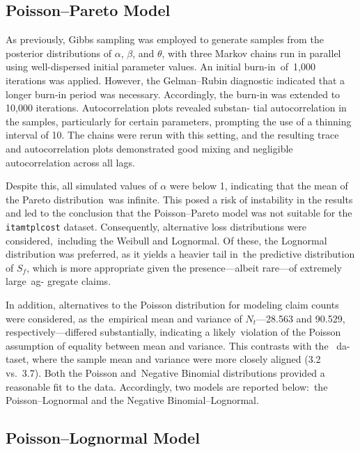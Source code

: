 \documentclass{Class/julia}
\begin{document}
\subsection{Poisson--Pareto Model}

As previously, Gibbs sampling was employed to generate samples from the posterior distributions of \(\alpha\), \(\beta\), and \(\theta\), with three Markov chains run in parallel using well-dispersed initial parameter values. An initial burn-in~of~1{,}000 iterations was applied. However, the Gelman--Rubin diagnostic \citeyearpar{Gelman1992} indicated that a longer burn-in period was necessary. Accordingly, the burn-in was extended to 10{,}000 iterations. Autocorrelation plots revealed substan- tial autocorrelation in the samples, particularly for certain parameters, prompting the use of a thinning interval of 10. The chains were rerun with this setting, and the resulting trace and autocorrelation plots demonstrated good mixing and negligible autocorrelation across all lags.

Despite this, all simulated values of \(\alpha\) were below 1, indicating that the mean of the Pareto distribution~was infinite. This posed a risk of instability in the results and led to the conclusion that the Poisson--Pareto model was not suitable for the \texttt{itamtplcost} dataset. Consequently, alternative loss distributions were considered,~including the Weibull and Lognormal. Of these, the Lognormal distribution was preferred, as it yields a heavier tail in~the predictive distribution of \( S_f \), which is more appropriate given the presence---albeit rare---of extremely large~ag- gregate claims.

In addition, alternatives to the Poisson distribution for modeling claim counts were considered, as the~empirical mean and variance of \( N_t \)—28.563 and 90.529, respectively—differed substantially, indicating a likely~violation of the Poisson assumption of equality between mean and variance. This contrasts with the \citet{rytgaard1990pareto}~da- taset, where the sample mean and variance were more closely aligned (3.2 vs.\ 3.7). Both the Poisson and~Negative Binomial distributions provided a reasonable fit to the data. Accordingly, two models are reported below:\ the Poisson--Lognormal and the Negative Binomial--Lognormal.

\subsection{Poisson--Lognormal Model}
\end{document}
